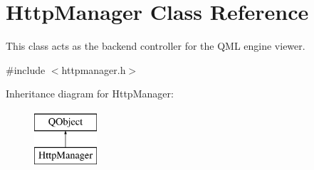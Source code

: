 \hypertarget{classHttpManager}{\section{Http\-Manager Class Reference}
\label{classHttpManager}
}


This class acts as the backend controller for the Q\-M\-L engine viewer.  




{\ttfamily \#include $<$httpmanager.\-h$>$}

Inheritance diagram for Http\-Manager\-:\begin{figure}[H]
\begin{center}
\leavevmode
\includegraphics[height=2.000000cm]{classHttpManager}
\end{center}
\end{figure}
